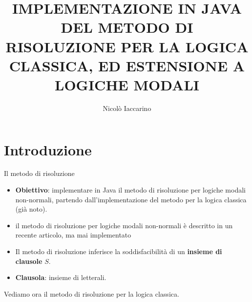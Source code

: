 \documentclass{beamer}
\title{IMPLEMENTAZIONE IN JAVA DEL METODO DI RISOLUZIONE PER LA LOGICA CLASSICA, ED ESTENSIONE A LOGICHE MODALI}
\author{Nicolò Iaccarino}
\begin{document}
\maketitle



\section{Introduzione}

\begin{frame}{Il metodo di risoluzione}
    \begin{itemize}
        \item \textbf{Obiettivo}: implementare in Java il metodo di risoluzione per logiche modali non-normali, partendo dall'implementazione del metodo per la logica classica (già noto).
        \vspace{10px}
        \item il metodo di risoluzione per logiche modali non-normali è descritto in un recente articolo, ma mai implementato
        \vspace{10px}
        \item Il metodo di risoluzione inferisce la soddisfacibilità di un \textbf{insieme di clausole} $S$.
        \vspace{10px}
        \item \textbf{Clausola}: insieme di letterali.
    \end{itemize}
    
    \vspace{10px}

    Vediamo ora il metodo di risoluzione per la logica classica.
\end{frame}
\end{document}
